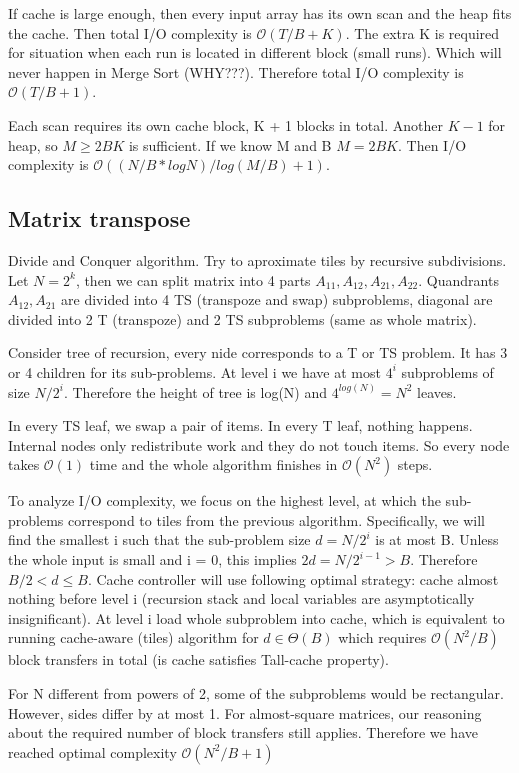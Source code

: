 \documentclass[12pt]{article}
\newcommand{\bigO}{\mathcal{O}}
\begin{document}
If cache is large enough, then every input array has its own scan and the heap fits the cache. Then total I/O complexity is $ \bigO(T/B + K)$. The extra K is required for situation when each run is located in different block (small runs). Which will never happen in Merge Sort (WHY???). Therefore total I/O complexity is $ \bigO(T/B + 1)$.

Each scan requires its own cache block, K + 1 blocks in total. Another  $K - 1$ for heap, so $M \geq 2BK$ is sufficient. If we know M and B $M = 2BK$. Then I/O complexity is $\bigO((N/B * log N)/log(M/B)+1)$.

\subsection{Matrix transpose}
Divide and Conquer algorithm. Try to aproximate tiles by recursive subdivisions. Let $N = 2^k$, then we can split matrix into 4 parts $A_{11}, A_{12}, A_{21}, A_{22}$. Quandrants $ A_{12}, A_{21} $ are divided into 4 TS (transpoze and swap) subproblems, diagonal are divided into 2 T (transpoze) and 2 TS subproblems (same as whole matrix).

Consider tree of recursion, every nide corresponds to a T or TS problem. It has 3 or 4 children for its sub-problems. At level i we have at most $ 4^i $ subproblems of size $ N/2^i $. Therefore the height of tree is log(N) and $ 4^{log(N)} = N^2 $ leaves.

In every TS leaf, we swap a pair of items. In every T leaf, nothing happens. Internal nodes only redistribute work and they do not touch items. So every node takes $ \bigO(1) $ time and the whole algorithm finishes in $ \bigO(N^2) $ steps.

To analyze I/O complexity, we focus on the highest level, at which the sub-problems correspond to tiles from the previous algorithm. Specifically, we will find the smallest i such that the sub-problem size $ d = N/2^i $ is at most B. Unless the whole input is small
and i = 0, this implies $ 2d = N/2^{i-1} > B$. Therefore $ B/2 < d \leq B$. Cache controller will use following optimal strategy: cache almost nothing before level i (recursion stack and local variables are asymptotically insignificant). At level i load whole subproblem into cache, which is equivalent to running cache-aware (tiles) algorithm for $ d \in \Theta(B) $ which requires $ \bigO(N^2/B) $ block transfers in total (is cache satisfies Tall-cache property).

For N different from powers of 2, some of the subproblems would be rectangular. However, sides differ by at most 1.  For almost-square matrices, our reasoning about the required number of block transfers still applies. Therefore we have reached optimal complexity $ \bigO(N^2/B + 1) $
\end{document}
